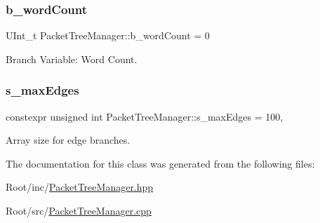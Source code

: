 \mbox{\label{class_packet_tree_manager_ad7d8e0343e3e5f949dc20e591b2e6b2b}} 
\subsubsection{\texorpdfstring{b\+\_\+word\+Count}{b\_wordCount}}
{\footnotesize\ttfamily U\+Int\+\_\+t Packet\+Tree\+Manager\+::b\+\_\+word\+Count = 0\hspace{0.3cm}{\ttfamily [private]}}



Branch Variable\+: Word Count. 

\mbox{\label{class_packet_tree_manager_a4ba06517ad1cb912ff70df1ff69231a5}} 
\subsubsection{\texorpdfstring{s\+\_\+max\+Edges}{s\_maxEdges}}
{\footnotesize\ttfamily constexpr unsigned int Packet\+Tree\+Manager\+::s\+\_\+max\+Edges = 100\hspace{0.3cm}{\ttfamily [static]}, {\ttfamily [private]}}



Array size for edge branches. 



The documentation for this class was generated from the following files\+:\begin{DoxyCompactItemize}
\item 
Root/inc/\hyperlink{_packet_tree_manager_8hpp}{Packet\+Tree\+Manager.\+hpp}\item 
Root/src/\hyperlink{_packet_tree_manager_8cpp}{Packet\+Tree\+Manager.\+cpp}\end{DoxyCompactItemize}
